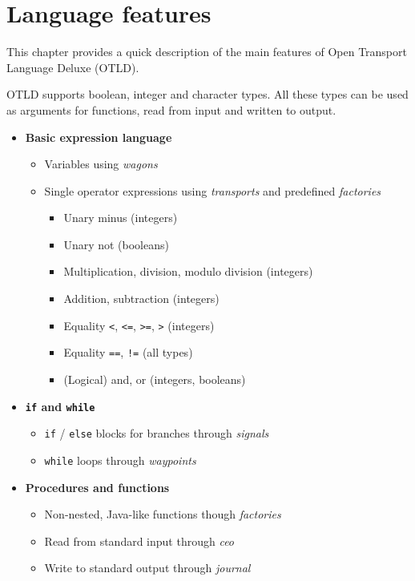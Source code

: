 \chapter{Language features}

This chapter provides a quick description of the main features of Open Transport Language Deluxe (OTLD).

OTLD supports boolean, integer and character types.
All these types can be used as arguments for functions, read from input and written to output.

\begin{itemize}
\item \textbf{Basic expression language}
	\begin{itemize}
	\item Variables using \emph{wagons}
	\item Single operator expressions using \emph{transports} and predefined \emph{factories}
		\begin{itemize}
		\item Unary minus (integers)
		\item Unary not (booleans)
		\item Multiplication, division, modulo division (integers)
		\item Addition, subtraction (integers)
		\item Equality \texttt{<}, \texttt{<=}, \texttt{>=}, \texttt{>} (integers)
		\item Equality \texttt{==}, \texttt{!=} (all types)
		\item (Logical) and, or (integers, booleans)
		\end{itemize}
	\end{itemize}
\item \textbf{\texttt{if} and \texttt{while}}
	\begin{itemize}
	\item \texttt{if} / \texttt{else} blocks for branches through \emph{signals}
	\item \texttt{while} loops through \emph{waypoints}
	\end{itemize}
\item \textbf{Procedures and functions}
	\begin{itemize}
	\item Non-nested, Java-like functions though \emph{factories}
	\item Read from standard input through \emph{ceo}
	\item Write to standard output through \emph{journal}
	\end{itemize}
\end{itemize}
